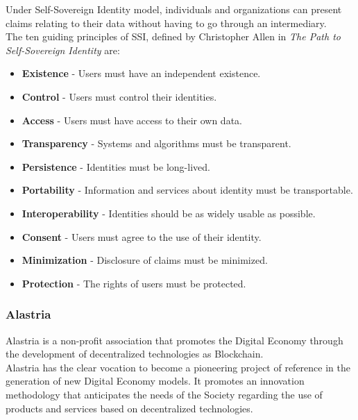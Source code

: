 \documentclass[a4paper, 12pt]{article} %
\begin{document}
            Under Self-Sovereign Identity model, individuals and organizations can present claims relating to their data without having to go through an intermediary.\\
            
            The ten guiding principles of SSI, defined by Christopher Allen in \textit{The Path to Self-Sovereign Identity}\cite{path-to-ssi} are:
            \begin{itemize}
                \item \textbf{Existence} - Users must have an independent existence.
                \item \textbf{Control} - Users must control their identities.
                \item \textbf{Access} - Users must have access to their own data.
                \item \textbf{Transparency} - Systems and algorithms must be transparent.
                \item \textbf{Persistence} - Identities must be long-lived.
                \item \textbf{Portability} - Information and services about identity must be transportable.
                \item \textbf{Interoperability} - Identities should be as widely usable as possible.
                \item \textbf{Consent} - Users must agree to the use of their identity.
                \item \textbf{Minimization} - Disclosure of claims must be minimized.
                \item \textbf{Protection} - The rights of users must be protected.
            \end{itemize}
            
        \subsubsection{Alastria}
        Alastria is a non-profit association that promotes the Digital Economy through the development of decentralized technologies as Blockchain.\\
        
        Alastria has the clear vocation to become a pioneering project of reference in the generation of new Digital Economy models. It promotes an innovation methodology that anticipates the needs of the Society regarding the use of products and services based on decentralized technologies.\\
        
\end{document}
